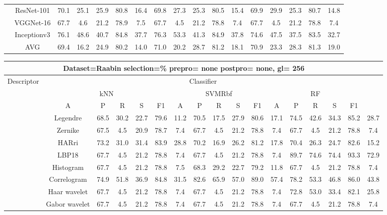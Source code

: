 \documentclass[12pt,italian]{article}
\begin{document}
\begin{tiny}
\begin{longtable}{lcccccccccccccccc}
& ResNet-101 & 70.1 & 25.1 & 25.9 & 80.8 & 16.4 & 69.8 & 27.3 & 25.3 & 80.5 & 15.4 & 69.9 & 29.9 & 25.3 & 80.7 & 14.8 \\ 
& VGGNet-16 & 67.7 &  4.6 & 21.2 & 78.9 &  7.5 & 67.7 &  4.5 & 21.2 & 78.8 &  7.4 & 67.7 &  4.5 & 21.2 & 78.8 &  7.4 \\ 
& Inceptionv3 & 76.1 & 48.6 & 40.7 & 84.8 & 37.7 & 76.3 & 53.3 & 41.3 & 84.9 & 37.8 & 74.6 & 47.5 & 37.5 & 83.5 & 32.7 \\ 
\hline
& AVG & 69.4 & 16.2 & 24.9 & 80.2 & 14.0 & 71.0 & 20.2 & 28.7 & 81.2 & 18.1 & 70.9 & 23.3 & 28.3 & 81.3 & 19.0 \\ 
\hline
\bottomrule
\end{longtable} 

 \pagebreak 
\begin{longtable}{lcccccccccccccccc}
\toprule
\multicolumn{16}{c}{Dataset=Raabin selection=\% prepro= none postpro= none, gl= 256} \\ 
\toprule
Descriptor & \multicolumn{15}{c}{Classifier} \\ 
& \multicolumn{5}{c}{kNN} & \multicolumn{5}{c}{SVMRbf} & \multicolumn{5}{c}{RF} \\ 
& A & P & R & S & F1 & A & P & R & S & F1 & A & P & R & S & F1 \\ 
\midrule
& Legendre & 68.5 & 30.2 & 22.7 & 79.6 & 11.2 & 70.5 & 17.5 & 27.9 & 80.6 & 17.1 & 74.5 & 42.6 & 34.3 & 85.2 & 28.7 \\ 
& Zernike & 67.5 &  4.5 & 20.9 & 78.7 &  7.4 & 67.7 &  4.5 & 21.2 & 78.8 &  7.4 & 67.7 &  4.5 & 21.2 & 78.8 &  7.4 \\ 
& HARri & 73.2 & 31.0 & 31.4 & 83.9 & 28.8 & 70.2 & 16.9 & 26.2 & 81.2 & 17.8 & 70.4 & 26.3 & 24.7 & 82.6 & 15.2 \\ 
& LBP18 & 67.7 &  4.5 & 21.2 & 78.8 &  7.4 & 67.7 &  4.5 & 21.2 & 78.8 &  7.4 & 89.7 & 74.6 & 74.4 & 93.3 & 72.9 \\ 
& Histogram & 67.7 &  4.5 & 21.2 & 78.8 &  7.5 & 68.3 & 29.2 & 22.7 & 79.2 & 11.8 & 67.7 &  4.5 & 21.2 & 78.8 &  7.4 \\ 
& Correlogram & 74.9 & 51.8 & 36.9 & 84.8 & 31.5 & 82.6 & 65.9 & 57.0 & 89.0 & 57.4 & 78.2 & 53.3 & 46.8 & 86.0 & 43.8 \\ 
& Haar wavelet & 67.7 &  4.5 & 21.2 & 78.8 &  7.4 & 67.7 &  4.5 & 21.2 & 78.8 &  7.4 & 72.8 & 53.0 & 33.4 & 82.1 & 25.8 \\ 
& Gabor wavelet & 67.7 &  4.5 & 21.2 & 78.8 &  7.4 & 67.7 &  4.5 & 21.2 & 78.8 &  7.4 & 67.7 &  4.5 & 21.2 & 78.8 &  7.4 \\ 

\end{longtable}
\end{tiny}
\end{document}
